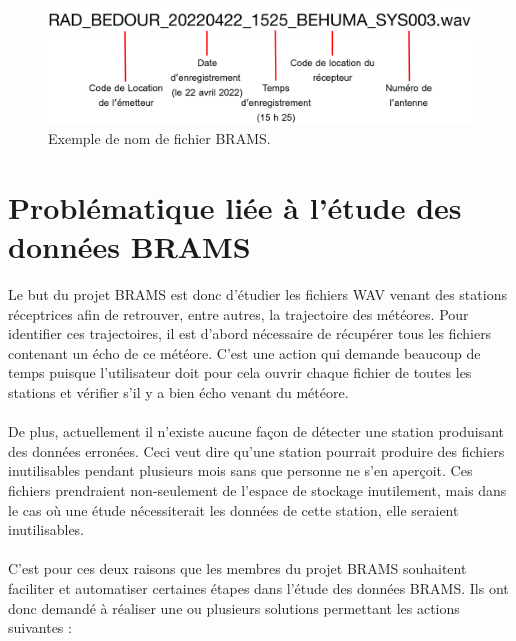 \documentclass[11pt]{article}
\begin{document}
\begin{figure}[t]
    \begin{center}
        \includegraphics[scale=0.15]{file_name.png}
        \caption{Exemple de nom de fichier BRAMS.}
        \label{fig:file_name_brams}
    \end{center}
\end{figure}

\newpage

\section{Problématique liée à l'étude des données BRAMS}

Le but du projet BRAMS est donc d'étudier les fichiers WAV venant des stations réceptrices afin de retrouver, entre autres, la trajectoire des météores.
Pour identifier ces trajectoires, il est d'abord nécessaire de récupérer tous les fichiers contenant un écho de ce météore.
C'est une action qui demande beaucoup de temps puisque l'utilisateur doit pour cela ouvrir chaque fichier de toutes les stations et vérifier s'il y a bien écho venant du météore.\\
\\
De plus, actuellement il n'existe aucune façon de détecter une station produisant des données erronées.
Ceci veut dire qu'une station pourrait produire des fichiers inutilisables pendant plusieurs mois sans que personne ne s'en aperçoit.
Ces fichiers prendraient non-seulement de l'espace de stockage inutilement, mais dans le cas où une étude nécessiterait les données de cette station, elle seraient inutilisables.\\
\\
C'est pour ces deux raisons que les membres du projet BRAMS souhaitent faciliter et automatiser certaines étapes dans l'étude des données BRAMS.
Ils ont donc demandé à réaliser une ou plusieurs solutions permettant les actions suivantes :
\end{document}
